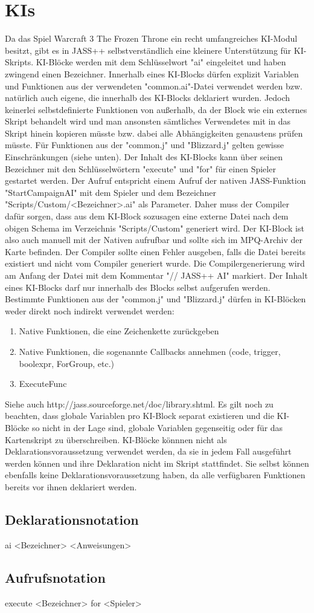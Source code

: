 \chapter{KIs}
Da das Spiel Warcraft 3 The Frozen Throne ein recht umfangreiches KI-Modul besitzt, gibt es in JASS++
selbstverständlich eine kleinere Unterstützung für KI-Skripts.
KI-Blöcke werden mit dem Schlüsselwort "ai" eingeleitet und haben zwingend einen Bezeichner.
Innerhalb eines KI-Blocks dürfen explizit Variablen und Funktionen aus der verwendeten "common.ai"-Datei
verwendet werden bzw. natürlich auch eigene, die innerhalb des KI-Blocks deklariert wurden.
Jedoch keinerlei selbstdefinierte Funktionen von außerhalb, da der Block wie ein externes Skript behandelt wird
und man ansonsten sämtliches Verwendetes mit in das Skript hinein kopieren müsste bzw. dabei alle Abhängigkeiten
genaustens prüfen müsste.
Für Funktionen aus der "common.j" und "Blizzard.j" gelten gewisse Einschränkungen (siehe unten).
Der Inhalt des KI-Blocks kann über seinen Bezeichner mit den Schlüsselwörtern "execute" und "for" für einen Spieler gestartet werden.
Der Aufruf entspricht einem Aufruf der nativen JASS-Funktion "StartCampaignAI" mit dem Spieler und dem Bezeichner "Scripts/Custom/<Bezeichner>.ai" als Parameter.
Daher muss der Compiler dafür sorgen, dass aus dem KI-Block sozusagen eine externe Datei nach dem obigen Schema im Verzeichnis "Scripts/Custom" generiert wird.
Der KI-Block ist also auch manuell mit der Nativen aufrufbar und sollte sich im MPQ-Archiv der Karte befinden. Der Compiler sollte einen Fehler ausgeben,
falls die Datei bereits existiert und nicht vom Compiler generiert wurde.
Die Compilergenerierung wird am Anfang der Datei mit dem Kommentar "// JASS++ AI" markiert.
Der Inhalt eines KI-Blocks darf nur innerhalb des Blocks selbst aufgerufen werden.
Bestimmte Funktionen aus der "common.j" und "Blizzard.j" dürfen in KI-Blöcken weder direkt noch indirekt verwendet werden:
\begin{enumerate}
\item Native Funktionen, die eine Zeichenkette zurückgeben
\item Native Funktionen, die sogenannte Callbacks annehmen (code, trigger, boolexpr, ForGroup, etc.)
\item ExecuteFunc
\end{enumerate}

Siehe auch http://jass.sourceforge.net/doc/library.shtml.
Es gilt noch zu beachten, dass globale Variablen pro KI-Block separat existieren und die KI-Blöcke so nicht in der Lage sind,
globale Variablen gegenseitig oder für das Kartenskript zu überschreiben.
KI-Blöcke könnnen nicht als Deklarationsvoraussetzung verwendet werden, da sie in jedem Fall ausgeführt werden können und
ihre Deklaration nicht im Skript stattfindet.
Sie selbst können ebenfalls keine Deklarationsvoraussetzung haben, da alle verfügbaren Funktionen bereits vor ihnen
deklariert werden.

\section{Deklarationsnotation}
ai <Bezeichner>
{
	<Anweisungen>
}

\section{Aufrufsnotation}
execute <Bezeichner> for <Spieler> 
